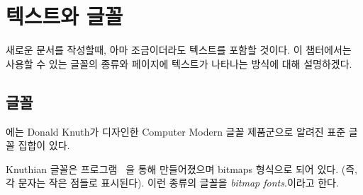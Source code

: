 \chapter{텍스트와 글꼴}



새로운 문서를 작성할때, 아마 조금이더라도 텍스트를 포함할 것이다. 
이 챕터에서는 사용할 수 있는 글꼴의 종류와 페이지에 텍스트가 나타나는 방식에 대해 설명하겠다.



\section{글꼴} \label{sec:fonts}

\alltx{}에는 Donald Knuth가 디자인한 Computer Modern  글꼴 제품군으로 알려진 표준 글꼴 집합이 있다.


Knuthian 글꼴은 \metafont{} 프로그램 ~\cite{METAFONT,CM}을 통해 만들어졌으며 bitmaps 형식으로 되어 있다. (즉, 각 문자는 작은 점들로 표시된다). 
이런 종류의 글꼴을 \emph{bitmap fonts}.이라고 한다. 




